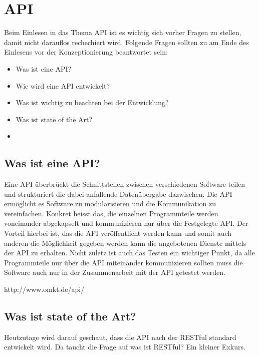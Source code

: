 \section{API}
Beim Einlesen in das Thema API ist es wichtig sich vorher Fragen zu stellen, damit nicht darauflos rechechiert wird. Folgende Fragen sollten zu am Ende des Einlesens vor der Konzeptionierung beantwortet sein:
\begin{itemize}
\item Was ist eine API?
\item Wie wird eine API entwickelt?
\item Was ist wichtig zu beachten bei der Entwicklung?
\item Was ist state of the Art?
\item 
\end{itemize}

\subsection{Was ist eine API?}
Eine API überbrückt die Schnittstellen zwischen verschiedenen Software teilen und strukturiert die dabei anfallende Datenübergabe dazwischen. Die API ermöglicht es Software zu modularisieren und die Kommunikation zu vereinfachen. Konkret heisst das, die einzelnen Programmteile werden voneinander abgekapselt und kommunizieren nur über die Festgelegte API. Der Vorteil hierbei ist, das die API veröffentlicht werden kann und somit auch anderen die Möglichkeit gegeben werden kann die angebotenen Dienste mittels der API zu erhalten. Nicht zuletz ist auch das Testen ein wichtiger Punkt, da alle Programmteile nur über die API miteinander kommunizieren sollten muss die Software auch nur in der Zusammenarbeit mit der API getestet werden. 

http://www.omkt.de/api/

\subsection{Was ist state of the Art?}
Heutzutage wird darauf geschaut, dass die API nach der RESTful standard entwickelt wird. Da taucht die Frage auf was ist RESTful? Ein kleiner Exkurs. 